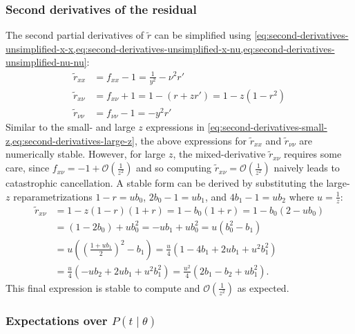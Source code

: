 \documentclass{article}
\begin{document}
\subsubsection{Second derivatives of the residual}\label{sec:second-derivatives-residual}

The second partial derivatives of $\tilde{r}$ can be simplified using \cref{eq:second-derivatives-unsimplified-x-x,eq:second-derivatives-unsimplified-x-nu,eq:second-derivatives-unsimplified-nu-nu}:
%
\begin{align}
  \tilde{r}_{xx}     & = f_{xx} - 1 = \frac{1}{y^2} - \nu^2 r'          \\
  \tilde{r}_{x\nu}   & = f_{x\nu} + 1 = 1 - (r + z r') = 1 - z(1 - r^2) \\
  \tilde{r}_{\nu\nu} & = f_{\nu\nu} - 1 = - y^2 r'
\end{align}
%
Similar to the small- and large $z$ expressions in \cref{eq:second-derivatives-small-z,eq:second-derivatives-large-z}, the above expressions for $\tilde{r}_{xx}$ and $\tilde{r}_{\nu\nu}$ are numerically stable.
However, for large $z$, the mixed-derivative $\tilde{r}_{x\nu}$ requires some care, since $f_{x\nu} = -1 + \mathcal{O}(\frac{1}{z^2})$ and so computing $\tilde{r}_{x\nu} = \mathcal{O}(\frac{1}{z^2})$ naively leads to catastrophic cancellation.
A stable form can be derived by substituting the large-$z$ reparametrizations $1 - r = u b_0$, $2 b_0 - 1 = u b_1$, and $4 b_1 - 1 = u b_2$ where $u = \frac{1}{z}$:
%
\begin{align}
  \tilde{r}_{x\nu} & = 1 - z(1 - r)(1 + r) = 1 - b_0 (1 + r) = 1 - b_0(2 - u b_0)                       \\
                   & = (1 - 2 b_0) + u b_0^2 = -u b_1 + u b_0^2 = u (b_0^2 - b_1)                       \\
                   & = u ((\frac{1 + u b_1}{2})^2 - b_1) = \frac{u}{4} (1 - 4b_1 + 2u b_1 + u^2 b_1^2)  \\
                   & = \frac{u}{4}(-u b_2 + 2u b_1 + u^2 b_1^2) = \frac{u^2}{4}(2 b_1 - b_2 + u b_1^2).
\end{align}
%
This final expression is stable to compute and $\mathcal{O}(\frac{1}{z^2})$ as expected.

\subsubsection{Expectations over $P(t \mid \theta)$}\label{sec:expectation-covariance}
\end{document}
